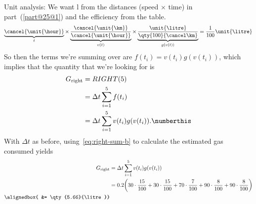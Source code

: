 \documentclass[
  coursecode={APSC 171},
  assignmentname={Week 6 Material - Defining and Estimating Integrals as Areas},
  solutiontitle=Solution,
  nodate,
  draft,
]{
  ltxanswer%
}
\begin{document}
\begin{questions}
\begin{parts}
\begin{solution}
        Unit analysis: We want \unit{\litre} from the distances (speed \(\times\) time) in part~(\ref{part@25@1}) and the efficiency from the table.
        \begin{equation*}
          \underbrace{\cancel{\unit{\hour}}}_{t} \times \underbrace{\frac{\cancel{\unit{\km}}}{\cancel{\unit{\hour}}}}_{v(t)} \times \underbrace{\frac{\unit{\litre}}{\qty{100}{\cancel\km}}}_{g(v(t))} = \frac{1}{100} \unit{\litre}
        \end{equation*}
        So then the terms we're summing over are \(f(t_{i}) = v(t_{i})g(v(t_{i}))\), which implies that the quantity that we're looking for is
        \begin{align*}
          G_{\text{right}} &= RIGHT(5)                                                                      \\
                           &= \Delta t \sum_{i=1}^{5} f(t_{i})                                              \\
                           &= \Delta t \sum_{i=1}^{5} v(t_{i})g(v(t_{i})).\numberthis\label{eq:right-sum-b}
        \end{align*}
        With \(\Delta t\) as before, using~\eqref{eq:right-sum-b} to calculate the estimated gas consumed yields
        \begin{align*}
          G_{\text{right}} &= \Delta t \sum_{i=1}^{5} v(t_{i})g(v(t_{i}))                                                                                                    \\
                           &= 0.2 \biggl(30 \cdot \frac{15}{100} + 30 \cdot \frac{15}{100} + 70 \cdot \frac{7}{100} + 90 \cdot \frac{8}{100} + 90 \cdot \frac{8}{100}\biggr) \\
          \alignedbox{     &= \qty{5.66}{\litre}}
        \end{align*}
      \end{solution}
    \end{parts}

    \question{}\
    \begin{parts}

\end{parts}
\end{questions}
\end{document}
